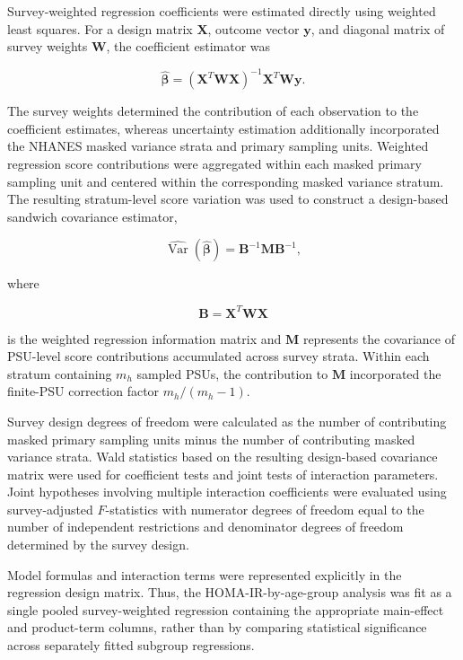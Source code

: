 \documentclass[11pt]{article}
\begin{document}
Survey-weighted regression coefficients were estimated directly using
weighted least squares. For a design matrix $\mathbf{X}$, outcome vector
$\mathbf{y}$, and diagonal matrix of survey weights $\mathbf{W}$, the
coefficient estimator was

\[
\widehat{\boldsymbol{\beta}}
=
\left(
\mathbf{X}^{T}\mathbf{W}\mathbf{X}
\right)^{-1}
\mathbf{X}^{T}\mathbf{W}\mathbf{y}.
\]

The survey weights determined the contribution of each observation to
the coefficient estimates, whereas uncertainty estimation additionally
incorporated the NHANES masked variance strata and primary sampling units.
Weighted regression score contributions were aggregated within each
masked primary sampling unit and centered within the corresponding
masked variance stratum. The resulting stratum-level score variation was
used to construct a design-based sandwich covariance estimator,

\[
\widehat{\operatorname{Var}}
\left(
\widehat{\boldsymbol{\beta}}
\right)
=
\mathbf{B}^{-1}
\mathbf{M}
\mathbf{B}^{-1},
\]

where

\[
\mathbf{B}
=
\mathbf{X}^{T}\mathbf{W}\mathbf{X}
\]

is the weighted regression information matrix and $\mathbf{M}$ represents
the covariance of PSU-level score contributions accumulated across survey
strata. Within each stratum containing $m_h$ sampled PSUs, the contribution
to $\mathbf{M}$ incorporated the finite-PSU correction factor
$m_h/(m_h-1)$.

Survey design degrees of freedom were calculated as the number of
contributing masked primary sampling units minus the number of contributing
masked variance strata. Wald statistics based on the resulting
design-based covariance matrix were used for coefficient tests and joint
tests of interaction parameters. Joint hypotheses involving multiple
interaction coefficients were evaluated using survey-adjusted
$F$-statistics with numerator degrees of freedom equal to the number of
independent restrictions and denominator degrees of freedom determined by
the survey design.

Model formulas and interaction terms were represented explicitly in the
regression design matrix. Thus, the HOMA-IR-by-age-group analysis was fit
as a single pooled survey-weighted regression containing the appropriate
main-effect and product-term columns, rather than by comparing statistical
significance across separately fitted subgroup regressions.
\end{document}
